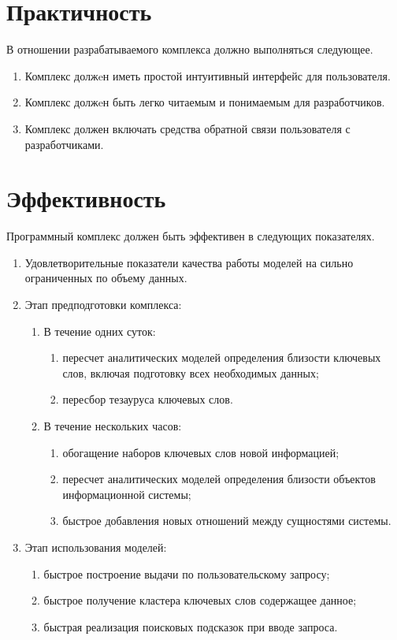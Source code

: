 \section{Практичность}
В отношении разрабатываемого комплекса должно выполняться следующее.
\begin{enumerate}
    \item Комплекс должeн иметь простой интуитивный интерфейс для пользователя.
    \item Комплекс должeн быть легко читаемым и понимаемым для разработчиков.
    \item Комплекс должен включать средства обратной связи пользователя с разработчиками.
\end{enumerate}
\section{Эффективность}
Программный комплекс должен быть эффективен в следующих показателях.
\begin{enumerate}
    \item Удовлетворительные показатели качества работы моделей на сильно ограниченных по объему данных.
    \item Этап предподготовки комплекса:
        \begin{enumerate}
            \item В течение одних суток:
            \begin{enumerate}
                \item пересчет аналитических моделей определения близости ключевых слов, включая подготовку всех необходимых данных;
                \item пересбор тезауруса ключевых слов.
            \end{enumerate}
            \item В течение нескольких часов:
            \begin{enumerate}
                \item обогащение наборов ключевых слов новой информацией;
                \item пересчет аналитических моделей определения близости объектов информационной системы;
                \item быстрое добавления новых отношений между сущностями системы.
            \end{enumerate}
        \end{enumerate}
    \item  Этап использования моделей:
        \begin{enumerate}
            \item  быстрое построение выдачи по пользовательскому запросу;
            \item  быстрое получение кластера ключевых слов содержащее данное;
            \item  быстрая реализация поисковых подсказок при вводе запроса.
        \end{enumerate}
\end{enumerate}
